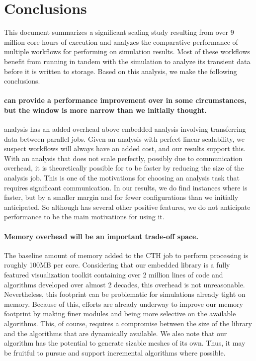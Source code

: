 \section{Conclusions}
\label{sec:Conclusion}

This document summarizes a significant scaling study resulting from over 9
million core-hours of execution and analyzes the comparative performance of
multiple workflows for performing \vda on simulation results.  Most of
these workflows benefit from running in tandem with the simulation to
analyze its transient data before it is written to storage.  Based on this
analysis, we make the following conclusions.

\paragraph{\Intransit can provide a performance improvement over \insitu in
  some circumstances, but the window is more narrow than we initially
  thought.}  \Intransit analysis has an added overhead above embedded
\insitu analysis involving transferring data between parallel jobs.  Given
an analysis with perfect linear scalability, we suspect \intransit
workflows will always have an added cost, and our results support this.
With an analysis that does not scale perfectly, possibly due to
communication overhead, it is theoretically possible for \intransit to be
faster by reducing the size of the analysis job.  This is one of the
motivations for choosing an analysis task that requires significant
communication.  In our results, we do find instances where \intransit is
faster, but by a smaller margin and for fewer configurations than we
initially anticipated.  So although \intransit has several other positive
features, we do not anticipate performance to be the main motivations for
using it.

\paragraph{Memory overhead will be an important trade-off space.}
The baseline amount of memory added to the CTH job to perform \insitu
processing is roughly 100MB per core.  Considering that our embedded
\insitu library is a fully featured visualization toolkit containing over 2
million lines of code and algorithms developed over almost 2 decades, this
overhead is not unreasonable.  Nevertheless, this footprint can be
problematic for simulations already tight on memory.  Because of this,
efforts are already underway to improve our memory footprint by making
finer modules and being more selective on the available algorithms.  This,
of course, requires a compromise between the size of the library and the
algorithms that are dynamically available.  We also note that our algorithm
has the potential to generate sizable meshes of its own.  Thus, it may be
fruitful to pursue and support incremental algorithms where possible.

